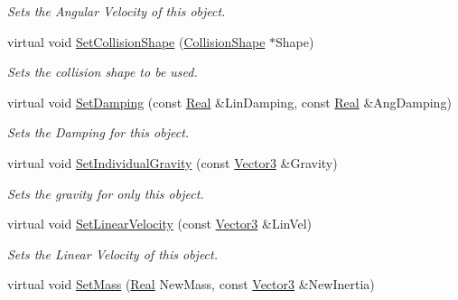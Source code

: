 \begin{DoxyCompactItemize}
\begin{DoxyCompactList}\small\item\em Sets the Angular Velocity of this object. \item\end{DoxyCompactList}\item 
virtual void \hyperlink{classMezzanine_1_1ActorRigidPhysicsSettings_a7583e5afc93dedc8a4403ea156fa0413}{SetCollisionShape} (\hyperlink{classMezzanine_1_1CollisionShape}{CollisionShape} $\ast$Shape)
\begin{DoxyCompactList}\small\item\em Sets the collision shape to be used. \item\end{DoxyCompactList}\item 
virtual void \hyperlink{classMezzanine_1_1ActorRigidPhysicsSettings_a9342e7ff1f485ddf99930f24e081084a}{SetDamping} (const \hyperlink{namespaceMezzanine_a726731b1a7df72bf3583e4a97282c6f6}{Real} \&LinDamping, const \hyperlink{namespaceMezzanine_a726731b1a7df72bf3583e4a97282c6f6}{Real} \&AngDamping)
\begin{DoxyCompactList}\small\item\em Sets the Damping for this object. \item\end{DoxyCompactList}\item 
virtual void \hyperlink{classMezzanine_1_1ActorRigidPhysicsSettings_ad1280574ff86c008c46c10a7133ca274}{SetIndividualGravity} (const \hyperlink{classMezzanine_1_1Vector3}{Vector3} \&Gravity)
\begin{DoxyCompactList}\small\item\em Sets the gravity for only this object. \item\end{DoxyCompactList}\item 
virtual void \hyperlink{classMezzanine_1_1ActorRigidPhysicsSettings_a861a7cf22d838cbbe108cd7daad59e76}{SetLinearVelocity} (const \hyperlink{classMezzanine_1_1Vector3}{Vector3} \&LinVel)
\begin{DoxyCompactList}\small\item\em Sets the Linear Velocity of this object. \item\end{DoxyCompactList}\item 
virtual void \hyperlink{classMezzanine_1_1ActorRigidPhysicsSettings_a8c2a5d88f76478a1d1ba4c194ad5d886}{SetMass} (\hyperlink{namespaceMezzanine_a726731b1a7df72bf3583e4a97282c6f6}{Real} NewMass, const \hyperlink{classMezzanine_1_1Vector3}{Vector3} \&NewInertia)

\end{DoxyCompactItemize}
